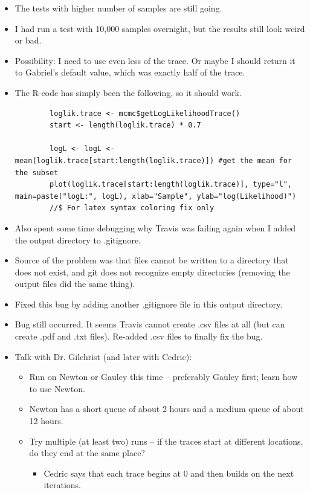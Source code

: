 \documentclass[12pt,hyperref]{labbook}
\begin{document}
\begin{itemize}
    \item The tests with higher number of samples are still going.
    \item I had run a test with 10,000 samples overnight, but the results still look weird or bad.
    \item Possibility: I need to use even less of the trace. Or maybe I should return it to Gabriel's default value, which was exactly half of the trace.
    \item The R-code has simply been the following, so it should work. 
    \begin{lstlisting}
        loglik.trace <- mcmc$getLogLikelihoodTrace()
        start <- length(loglik.trace) * 0.7 
      
        logL <- logL <- mean(loglik.trace[start:length(loglik.trace)]) #get the mean for the subset
        plot(loglik.trace[start:length(loglik.trace)], type="l", main=paste("logL:", logL), xlab="Sample", ylab="log(Likelihood)")
        //$ For latex syntax coloring fix only
    \end{lstlisting}
    \item Also spent some time debugging why Travis was failing again when I added the output directory to .gitignore.
    \item Source of the problem was that files cannot be written to a directory that does not exist, and git does not recognize empty directories (removing the output files did the same thing).
    \item Fixed this bug by adding another .gitignore file in this output directory.
    \item Bug still occurred. It seems Travis cannot create .csv files at all (but can create .pdf and .txt files). Re-added .csv files to finally fix the bug.
    \item Talk with Dr. Gilchrist (and later with Cedric):
    \begin{itemize}
        \item Run on Newton or Gauley this time -- preferably Gauley first; learn how to use Newton.
        \item Newton has a short queue of about 2 hours and a medium queue of about 12 hours.
        \item Try multiple (at least two) runs -- if the traces start at different locations, do they end at the same place?
        \begin{itemize}
            \item Cedric says that each trace begins at 0 and then builds on the next iterations. 

\end{itemize}
\end{itemize}
\end{itemize}
\end{document}
